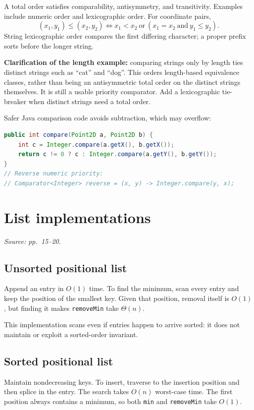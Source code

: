 \documentclass[11pt]{article}
\begin{document}
A total order satisfies comparability, antisymmetry, and transitivity. Examples include numeric order and lexicographic order. For coordinate pairs,
\[
(x_1,y_1)\le(x_2,y_2)
\iff x_1<x_2\ \text{or}\ (x_1=x_2\ \text{and}\ y_1\le y_2).
\]
String lexicographic order compares the first differing character; a proper prefix sorts before the longer string.

\textbf{Clarification of the length example:} comparing strings only by length ties distinct strings such as ``cat'' and ``dog''. This orders length-based equivalence classes, rather than being an antisymmetric total order on the distinct strings themselves. It is still a usable priority comparator. Add a lexicographic tie-breaker when distinct strings need a total order.

Safer Java comparison code avoids subtraction, which may overflow:
\begin{lstlisting}[language=Java]
public int compare(Point2D a, Point2D b) {
    int c = Integer.compare(a.getX(), b.getX());
    return c != 0 ? c : Integer.compare(a.getY(), b.getY());
}
// Reverse numeric priority:
// Comparator<Integer> reverse = (x, y) -> Integer.compare(y, x);
\end{lstlisting}

\section{List implementations}
\textit{Source: pp.\ 15--20.}

\subsection{Unsorted positional list}
Append an entry in $O(1)$ time. To find the minimum, scan every entry and keep the position of the smallest key. Given that position, removal itself is $O(1)$, but finding it makes \texttt{removeMin} take $\Theta(n)$.

This implementation scans even if entries happen to arrive sorted: it does not maintain or exploit a sorted-order invariant.

\subsection{Sorted positional list}
Maintain nondecreasing keys. To insert, traverse to the insertion position and then splice in the entry. The search takes $O(n)$ worst-case time. The first position always contains a minimum, so both \texttt{min} and \texttt{removeMin} take $O(1)$.
\end{document}
